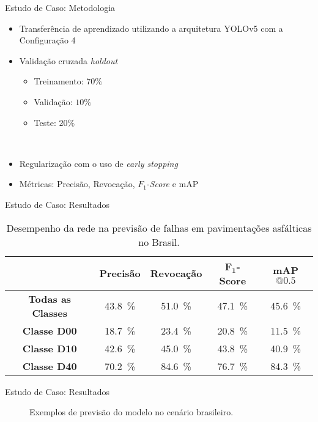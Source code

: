 \begin{frame}{Estudo de Caso: Metodologia}
\begin{itemize}
    \item Transferência de aprendizado utilizando a arquitetura YOLOv5 com a Configuração 4
    \item Validação cruzada \emph{holdout}
    \begin{itemize}
    \item Treinamento: $70\%$
    \item Validação: $10\%$
    \item Teste: $20\%$
\end{itemize}
\ \ \newline
\item Regularização com o uso de \alert{\emph{early stopping}}
\item \alert{Métricas}: Precisão, Revocação, $F_1$-\emph{Score} e mAP
\end{itemize}
\end{frame}


\begin{frame}{Estudo de Caso: Resultados}
\begin{table}[h!]
\begin{center}
\caption{Desempenho da rede na previsão de falhas em pavimentações asfálticas no Brasil.} \label{tab:yoloBrasil}
\begin{tabular}{ccccc}
	\toprule
	  & \textbf{Precisão} & \textbf{Revocação} & $\mathbf{F_1}$\textbf{-Score} & \textbf{mAP}$\mathbf{@0.5}$\\
	\midrule
\textbf{Todas as Classes} & \SI{43,8}{\percent} & \SI{51,0}{\percent} & \SI{47,1}{\percent} & \SI{45,6}{\percent}\\
\textbf{Classe D00} & \SI{18,7}{\percent} & \SI{23,4}{\percent} & \SI{20,8}{\percent} & \SI{11,5}{\percent}\\
\textbf{Classe D10} & \SI{42,6}{\percent} & \SI{45,0}{\percent} & \SI{43,8}{\percent} & \SI{40,9}{\percent}\\
\textbf{Classe D40} & \SI{70,2}{\percent} & \SI{84,6}{\percent} & \SI{76,7}{\percent} & \SI{84,3}{\percent}\\
\bottomrule
\end{tabular}
\end{center}
\end{table}

\end{frame}

\begin{frame}{Estudo de Caso: Resultados}
\begin{figure}[h!]
	\centering
	\hfill {} 	\hfill
	 \hfill
    \caption{Exemplos de previsão do modelo no cenário brasileiro.}
\end{figure}
\end{frame}


